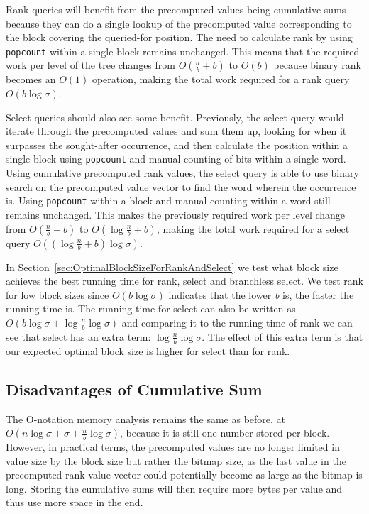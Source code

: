 Rank queries will benefit from the precomputed values being cumulative sums because they can do a single lookup of the precomputed value corresponding to the block covering the queried-for position.
The need to calculate rank by using \texttt{popcount} within a single block remains unchanged.
This means that the required work per level of the tree changes from $O(\frac{n}{b}+b)$ to $O(b)$ because binary rank becomes an $O(1)$ operation, making the total work required for a rank query $O(b \log \sigma)$.

Select queries should also see some benefit.
Previously, the select query would iterate through the precomputed values and sum them up, looking for when it surpasses the sought-after occurrence, and then calculate the position within a single block using \texttt{popcount} and manual counting of bits within a single word.
Using cumulative precomputed rank values, the select query is able to use binary search on the precomputed value vector to find the word wherein the occurrence is.
Using \texttt{popcount} within a block and manual counting within a word still remains unchanged.
This makes the previously required work per level change from $O(\frac{n}{b} + b)$ to $O(\log \frac{n}{b} + b)$, making the total work required for a select query $O((\log \frac{n}{b} + b) \log \sigma)$.

In Section~\ref{sec:OptimalBlockSizeForRankAndSelect} we test what block size achieves the best running time for rank, select and branchless select.
We test rank for low block sizes since $O(b \log \sigma)$ indicates that the lower \textit{b} is, the faster the running time is.
The running time for select can also be written as $O(b \log \sigma + \log \frac{n}{b} \log \sigma)$ and comparing it to the running time of rank we can see that select has an extra term: $\log \frac{n}{b} \log \sigma$.
The effect of this extra term is that our expected optimal block size is higher for select than for rank.

\subsection{Disadvantages of Cumulative Sum}
The O-notation memory analysis remains the same as before, at $O(n \log \sigma + \sigma + \frac{n}{b} \log \sigma)$, because it is still one number stored per block.
However, in practical terms, the precomputed values are no longer limited in value size by the block size but rather the bitmap size, as the last value in the precomputed rank value vector could potentially become as large as the bitmap is long.
Storing the cumulative sums will then require more bytes per value and thus use more space in the end.

